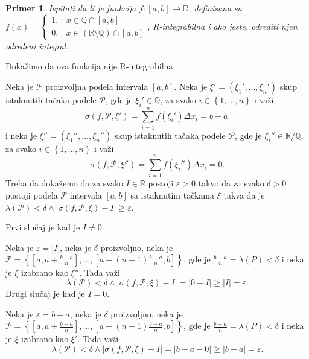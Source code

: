 \documentclass{article}
\newtheorem{prim}{Primer}[section]
\begin{document}
\begin{primbox}
    \label{primer_2.2}
    \begin{prim}
        Ispitati da li je funkcija $f: \left[a,b\right]\longrightarrow\mathbb{R}$, definisana sa $f\left(x\right)=
            \begin{cases}
                1, & x \in \mathbb{Q} \cap \left[a,b\right]                                   \\
                0, & x \in \left(\mathbb{R} \setminus \mathbb{Q}\right) \cap \left[a,b\right]
            \end{cases}$, R-integrabilna i ako jeste, odrediti njen određeni integral.
    \end{prim}
    Dokažimo da ova funkcija nije R-integrabilna.\par
    Neka je $\mathcal{P}$ proizvoljna podela intervala $\left[a,b\right]$. Neka je
    $\xi'=\left(\xi_1',\dotsc,\xi_n'\right)$ skup istaknutih tačaka podele $\mathcal{P}$, gde je $\xi_i'\in\mathbb{Q}$,
    za svako $i\in\left\{1,\dotsc,n\right\}$ i važi
    \begin{equation}
        \label{primer_2.2:eq1}
        \sigma\left(f,\mathcal{P},\xi'\right)=\sum_{i=1}^{n}f\left(\xi_i'\right)\Delta x_i=b-a.
    \end{equation}
    i neka je $\xi''=\left(\xi_1'',\dotsc,\xi_n''\right)$ skup istaknutih tačaka podele $\mathcal{P}$, gde je $\xi_i''\in\mathbb{R}\slash\mathbb{Q}$,
    za svako $i\in\left\{1,\dotsc,n\right\}$ i važi
    \begin{equation}
        \label{primer_2.2:eq2}
        \sigma\left(f,\mathcal{P},\xi''\right)=\sum_{i=1}^{n}f\left(\xi_i''\right)\Delta x_i=0.
    \end{equation}
    Treba da dokažemo da za svako $I\in\mathbb{R}$ postoji $\varepsilon>0$ takvo da za svako $\delta>0$ postoji podela $\mathcal{P}$
    intervala $\left[a,b\right]$ sa istaknutim tačkama $\xi$ takva da je $\lambda(\mathcal{P})<\delta\land\left|\sigma\left(f,\mathcal{P},\xi\right)-I\right|\geq\varepsilon$.\par
    Prvi slučaj je kad je $I\neq0$.\par
    Neka je $\varepsilon=\left|I\right|$, neka je $\delta$ proizvoljno,
    neka je $\displaystyle\mathcal{P}=\left\{\left[a,a+\frac{b-a}{n}\right],\dotsc,\left[a+\left(n-1\right)\frac{b-a}{n},b\right]\right\}$,
    gde je $\displaystyle\frac{b-a}{n}=\lambda\left(P\right)<\delta$ i neka je $\xi$ izabrano kao $\xi''$. Tada
    važi $$\lambda\left(\mathcal{P}\right)<\delta\land\left|\sigma\left(f,\mathcal{P},\xi\right)-I\right|=\left|0-I\right|\geq\left|I\right|=\varepsilon.$$
    Drugi slučaj je kad je $I=0$.\par
    Neka je $\varepsilon=b-a$, neka je $\delta$ proizvoljno, neka je $\displaystyle\mathcal{P}=\left\{\left[a,a+\frac{b-a}{n}\right],\dotsc,\left[a+\left(n-1\right)\frac{b-a}{n},b\right]\right\}$,
    gde je $\displaystyle\frac{b-a}{n}=\lambda\left(P\right)<\delta$ i neka je $\xi$ izabrano kao $\xi'$. Tada
    važi $$\lambda\left(\mathcal{P}\right)<\delta\land\left|\sigma\left(f,\mathcal{P},\xi\right)-I\right|=\left|b-a-0\right|\geq\left|b-a\right|=\varepsilon.$$
\end{primbox}
\end{document}
